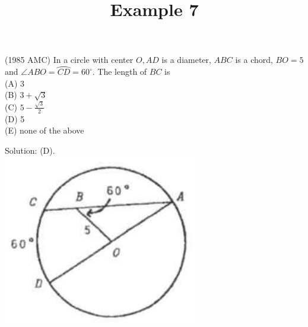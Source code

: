 \documentclass{article}
\title{Example 7}
\date{}
\begin{document}
\maketitle

(1985 AMC) In a circle with center \(O, A D\) is a diameter, \(A B C\) is a chord, \(B O=5\) and \(\angle A B O=\wideparen{C D}=60^{\circ}\). The length of \(B C\) is\\
(A) 3\\
(B) \(3+\sqrt{3}\)\\
(C) \(5-\frac{\sqrt{3}}{2}\)\\
(D) 5\\
(E) none of the above

Solution: (D).\\
\centering
\includegraphics[width=\textwidth]{images/problem_image_1.jpg}
\end{document}

